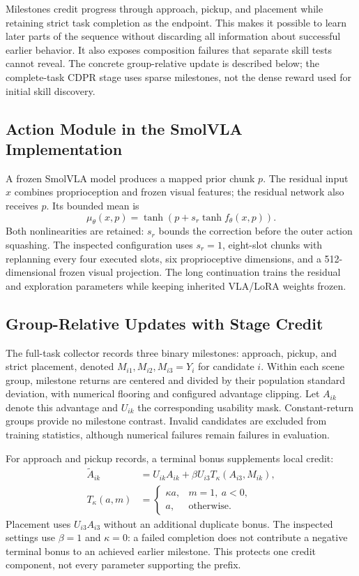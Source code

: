 Milestones credit progress through approach, pickup, and placement while retaining strict task completion as the endpoint. This makes it possible to learn later parts of the sequence without discarding all information about successful earlier behavior. It also exposes composition failures that separate skill tests cannot reveal. The concrete group-relative update is described below; the complete-task CDPR stage uses sparse milestones, not the dense reward used for initial skill discovery.

\subsection{Action Module in the SmolVLA Implementation}
A frozen SmolVLA model produces a mapped prior chunk $p$. The residual input $x$ combines proprioception and frozen visual features; the residual network also receives $p$. Its bounded mean is
\begin{equation}
\mu_\theta(x,p)=\tanh\!\left(p+s_r\tanh f_\theta(x,p)\right).
\label{eq:actor}
\end{equation}
Both nonlinearities are retained: $s_r$ bounds the correction before the outer action squashing. The inspected configuration uses $s_r=1$, eight-slot chunks with replanning every four executed slots, six proprioceptive dimensions, and a 512-dimensional frozen visual projection. The long continuation trains the residual and exploration parameters while keeping inherited VLA/LoRA weights frozen. 

\subsection{Group-Relative Updates with Stage Credit}
The full-task collector records three binary milestones: approach, pickup, and strict placement, denoted $M_{i1},M_{i2},M_{i3}=Y_i$ for candidate $i$. Within each scene group, milestone returns are centered and divided by their population standard deviation, with numerical flooring and configured advantage clipping. Let $A_{ik}$ denote this advantage and $U_{ik}$ the corresponding usability mask. Constant-return groups provide no milestone contrast. Invalid candidates are excluded from training statistics, although numerical failures remain failures in evaluation.

For approach and pickup records, a terminal bonus supplements local credit:
\begin{align}
\widetilde A_{ik}&=U_{ik}A_{ik}+\beta U_{i3}T_\kappa(A_{i3},M_{ik}),\label{eq:credit}\\
T_\kappa(a,m)&=\begin{cases}\kappa a,&m=1,\ a<0,\\a,&\text{otherwise}.\end{cases}
\end{align}
Placement uses $U_{i3}A_{i3}$ without an additional duplicate bonus. The inspected settings use $\beta=1$ and $\kappa=0$: a failed completion does not contribute a negative terminal bonus to an achieved earlier milestone. This protects one credit component, not every parameter supporting the prefix.

